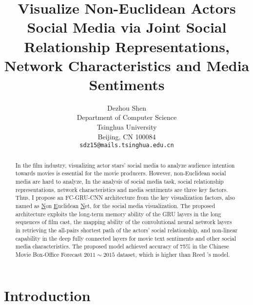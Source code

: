 \documentclass[review]{cvpr}
\begin{document}
\title{Visualize Non-Euclidean Actors Social Media via Joint Social Relationship Representations, Network Characteristics and Media Sentiments}

\author{Dezhou Shen\\
Department of Computer Science\\
Tsinghua University\\
Beijing, CN 100084\\
{\tt\small sdz15@mails.tsinghua.edu.cn}
}

\maketitle


\begin{abstract}

  In the film industry, visualizing actor stars' social media to analyze audience intention towards movies is essential for the movie producers.
  However, non-Euclidean social media are hard to analyze,
  In the analysis of social media task, social relationship representations, network characteristics and media sentiments are three key factors.
  Thus, I propose an FC-GRU-CNN architecture from the key visualization factors,
  also named as \underline{N}on \underline{E}uclidean \underline{N}et, for the social media visualization.
  The proposed architecture exploits the long-term memory ability of the GRU layers in the long sequences of film cast,
  the mapping ability of the convolutional neural network layers in retrieving the all-pairs shortest path of the actors' social relationship,
  and non-linear capability in the deep fully connected layers for movie text sentiments and other social media characteristics.
  The proposed model achieved accuracy of 75\% in the Chinese Movie Box-Office Forecast $2011\sim2015$ dataset, which is higher than Reed \etal's model.

\end{abstract}

\section{Introduction}
\end{document}
